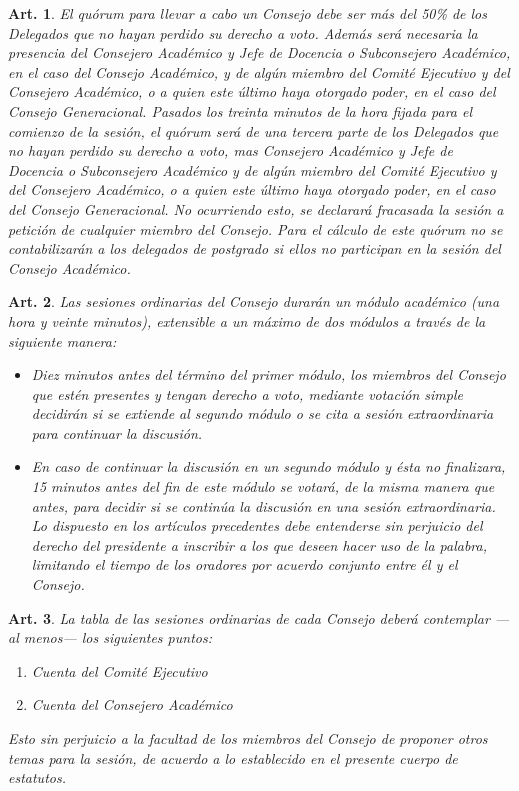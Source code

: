 \documentclass[letterpaper,11pt]{article}
\theoremstyle{plain}
\newtheorem{art}{Art.} %
\begin{document}
			\begin{art}\label{quorumConsejo}
				El quórum para llevar a cabo un Consejo debe ser más del 50\% de los Delegados que no hayan perdido su derecho a voto. Además será necesaria la presencia del Consejero Académico y Jefe de Docencia o Subconsejero Académico, en el caso del Consejo Académico, y de algún miembro del Comité Ejecutivo y del Consejero Académico, o a quien este último haya otorgado poder, en el caso del Consejo Generacional. Pasados los treinta minutos de la hora fijada para el comienzo de la sesión, el quórum será de una tercera parte de los Delegados que no hayan perdido su derecho a voto, mas Consejero Académico y Jefe de Docencia o Subconsejero Académico y de algún miembro del Comité Ejecutivo y del Consejero Académico, o a quien este último haya otorgado poder, en el caso del Consejo Generacional. No ocurriendo esto, se declarará fracasada la sesión a petición de cualquier miembro del Consejo. Para el cálculo de este quórum no se contabilizarán a los delegados de postgrado si ellos no participan en la sesión del Consejo Académico.
			\end{art}

			\begin{art}\label{duracionConsejosOrdinarios}
				Las sesiones ordinarias del Consejo durarán un módulo académico (una hora y veinte minutos), extensible a un máximo de dos módulos a través de la siguiente manera:
				\begin{itemize}
					\item Diez minutos antes del término del primer módulo, los miembros del Consejo que estén presentes y tengan derecho a voto, mediante votación simple decidirán si se extiende al segundo módulo o se cita a sesión extraordinaria para continuar la discusión.
					\item En caso de continuar la discusión en un segundo módulo y ésta no finalizara, 15 minutos antes del fin de este módulo se votará, de la misma manera que antes, para decidir si se continúa la discusión en una sesión extraordinaria. Lo dispuesto en los artículos precedentes debe entenderse sin perjuicio del derecho del presidente a inscribir a los que deseen hacer uso de la palabra, limitando el tiempo de los oradores por acuerdo conjunto entre él y el Consejo.
				\end{itemize}
			\end{art}

			\begin{art}\label{cuentasPublicasOrdinarias}
				La tabla de las sesiones ordinarias de cada Consejo deberá contemplar ---al menos--- los siguientes puntos:
				\begin{enumerate}
					\item Cuenta del Comité Ejecutivo
					\item Cuenta del Consejero Académico
				\end{enumerate}
				Esto sin perjuicio a la facultad de los miembros del Consejo de proponer otros temas para la sesión, de acuerdo a lo establecido en el presente cuerpo de estatutos.
			\end{art}
\end{document}
